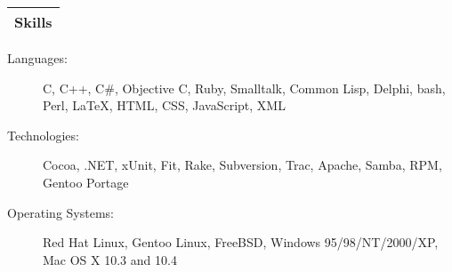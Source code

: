 \documentclass[letterpaper,11pt]{article}
\makeatletter
\newcommand{\resumesection}[1]{
  \setlength\extrarowheight{4pt}
  \begin{tabularx}{\linewidth}[h]{L}
    \hline\textbf{\Large #1}\\\hline
\end{tabularx}}
\newcommand{\resumeitemheading}[4]{
  \item
  \begin{tabular*}{6.5in}{l@{\extracolsep{\fill}}r}
    \textbf{#1} & #2 \\
    \textit{#3} & \textit{#4} \\
\end{tabular*}}
\newcommand{\employerheading}[4]{\resumeitemheading{#1}{#2}{#3}{#4}\vspace{-6pt}}
\newcommand{\responsibility}[1]{\item #1 \vspace{-2pt}}
\makeatother
\begin{document}
\begin{itemize}



\end{itemize}

\resumesection{Skills}

\begin{description}
\item[Languages:] C, C++, C\#, Objective C, Ruby, Smalltalk, Common Lisp,
  Delphi, bash, Perl, \LaTeX, HTML, CSS, JavaScript, XML
\item[Technologies:] Cocoa, .NET, xUnit, Fit, Rake, Subversion, Trac, Apache,
  Samba, RPM, Gentoo Portage
\item[Operating Systems:] Red Hat Linux, Gentoo Linux, FreeBSD, Windows
  95/98/NT/2000/XP, Mac OS X 10.3 and 10.4
\end{description}
\end{document}
